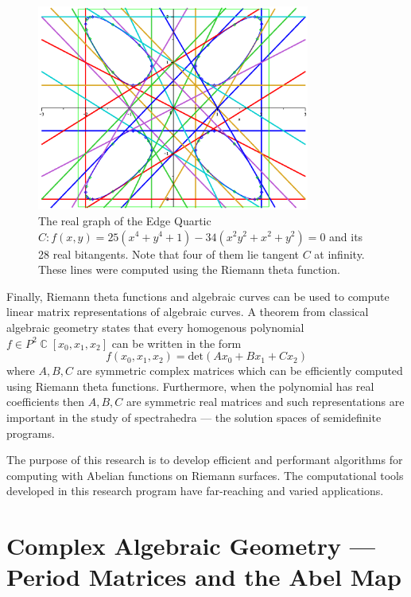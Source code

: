 \documentclass[10pt,twoside]{article}
\theoremstyle{plain}
\theoremstyle{definition}
\numberwithin{equation}{section}
\DeclareMathOperator{\CC}{\mathbb{C}}
\begin{document}
\begin{figure}[t]
  \centering
  \includegraphics[width=0.8\textwidth]{images/edgequartic}
  \caption{The real graph of the Edge Quartic $C: f(x,y) = 25(x^4+y^4+1)
    - 34(x^2y^2+x^2+y^2) = 0$ and its 28 real bitangents. Note that four
    of them lie tangent $C$ at infinity. These lines were computed using
    the Riemann theta function.}
  \label{fig: edge}
\end{figure}

Finally, Riemann theta functions and algebraic curves can be used to
compute linear matrix representations of algebraic curves. A theorem
from classical algebraic geometry states that every homogenous
polynomial $f \in P^2\CC[x_0,x_1,x_2]$ can be written in the form
\[
   f(x_0,x_1,x_2) = \text{det}
   \left( A x_0 + B x_1 + C x_2 \right)
\]
where $A,B,C$ are symmetric complex matrices which can be efficiently
computed using Riemann theta functions. Furthermore, when the polynomial
has real coefficients then $A,B,C$ are symmetric real matrices and such
representations are important in the study of spectrahedra --- the
solution spaces of semidefinite programs. \cite{PSV10}

The purpose of this research is to develop efficient and performant
algorithms for computing with Abelian functions on Riemann surfaces. The
computational tools developed in this research program have far-reaching
and varied applications.


\section{Complex Algebraic Geometry --- Period Matrices and the Abel Map}
\end{document}
